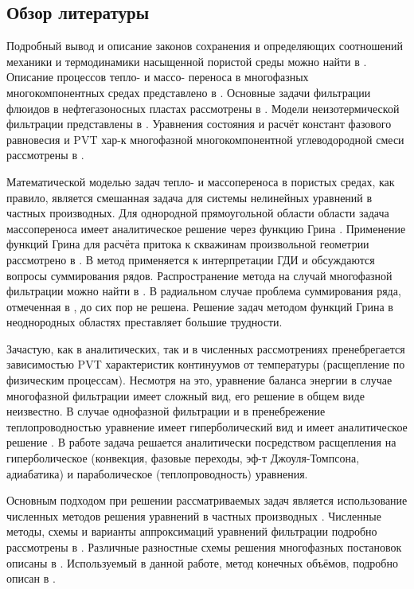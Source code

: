 \subsection*{Обзор литературы}
	Подробный вывод и описание законов сохранения и определяющих соотношений механики и термодинамики насыщенной пористой среды можно найти в \cite{kondaurov}.
	Описание процессов тепло- и массо- переноса в многофазных многокомпонентных средах представлено в \cite{nigmatulin, multiphase}. 
	Основные задачи фильтрации флюидов в нефтегазоносных пластах рассмотрены в \cite{basniev, charniy}.
	Модели неизотермической фильтрации представлены в \cite{checkalyuk, alishaev}.
	Уравнения состояния и расчёт констант фазового равновесия и PVT хар-к многофазной многокомпонентной углеводородной смеси рассмотрены в \cite{brusilovskiy}.

	Математической моделью задач тепло- и массопереноса в пористых средах, как правило, является смешанная задача для системы нелинейных уравнений в частных производных. Для однородной прямоугольной области области задача массопереноса имеет аналитическое решение через функцию Грина \cite{vladimirov}.
	Применение функций Грина для расчёта притока к скважинам произвольной геометрии рассмотрено в \cite{aziz_green}.
	В \cite{posv1} метод применяется к интерпретации ГДИ и обсуждаются вопросы суммирования рядов.
	Распространение метода на случай многофазной фильтрации можно найти в \cite{posv2}.
	В радиальном случае проблема суммирования ряда, отмеченная в \cite{charniy}, до сих пор не решена.
	Решение задач методом функций Грина в неоднородных областях преставляет большие трудности.

	Зачастую, как в аналитических, так и в численных рассмотрениях пренебрегается зависимостью PVT характеристик континуумов от температуры (расщепление по физическим процессам). Несмотря на это, уравнение баланса энергии в случае многофазной фильтрации имеет сложный вид, его решение в общем виде неизвестно.
	В случае однофазной фильтрации и в пренебрежение теплопроводностью уравнение имеет гиперболический вид и имеет аналитическое решение \cite{checkalyuk,ramazanov_spe}.
	В работе \cite{duru} задача решается аналитически посредством расщепления на гиперболическое (конвекция, фазовые переходы, эф-т Джоуля-Томпсона, адиабатика) и параболическое (теплопроводность) уравнения.

	Основным подходом при решении рассматриваемых задач является использование численных методов решения уравнений в частных производных \cite{petrov}.
	Численные методы, схемы и варианты аппроксимаций уравнений фильтрации подробно рассмотрены в \cite{kanevskaya, aziz, chen}.
	Различные разностные схемы решения многофазных постановок описаны в \cite{keldysh}.
	Используемый в данной работе, метод конечных объёмов, подробно описан в \cite{leveque}.
	
